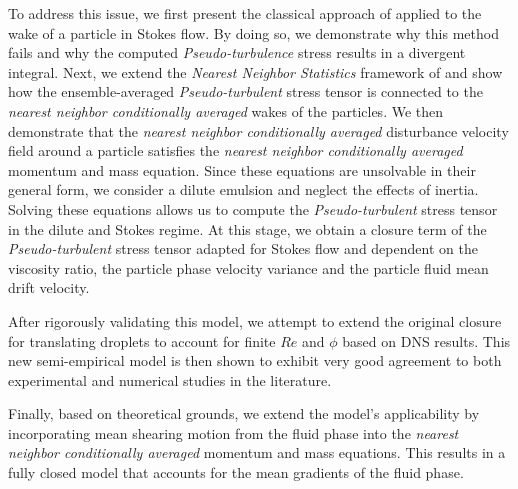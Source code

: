 To address this issue, we first present the classical approach of \citet{van1998pseudo} applied to the wake of a particle in Stokes flow. 
By doing so, we demonstrate why this method fails and why the computed \textit{Pseudo-turbulence} stress results in a divergent integral. 
Next, we extend the \textit{Nearest Neighbor Statistics} framework of \citet{zhang2021ensemble} and show how the ensemble-averaged \textit{Pseudo-turbulent} stress tensor is connected to the \textit{nearest neighbor conditionally averaged} wakes of the particles. 
We then demonstrate that the \textit{nearest neighbor conditionally averaged} disturbance velocity field around a particle satisfies the \textit{nearest neighbor conditionally averaged} momentum and mass equation. 
Since these equations are unsolvable in their general form, we consider a dilute emulsion and neglect the effects of inertia.
Solving these equations allows us to compute the \textit{Pseudo-turbulent} stress tensor in the dilute and Stokes regime. 
At this stage, we obtain a closure term of the \textit{Pseudo-turbulent} stress tensor adapted for Stokes flow and dependent on the viscosity ratio, the particle phase velocity variance and the particle fluid mean drift velocity.  


After rigorously validating this model, we attempt to extend the original closure for translating droplets to account for finite $Re$ and $\phi$ based on DNS results.
This new semi-empirical model is then shown to exhibit very good agreement to both experimental and numerical studies in the literature. 

Finally, based on theoretical grounds, we extend the model's applicability by incorporating mean shearing motion from the fluid phase into the \textit{nearest neighbor conditionally averaged} momentum and mass equations. 
This results in a fully closed model that accounts for the mean gradients of the fluid phase.